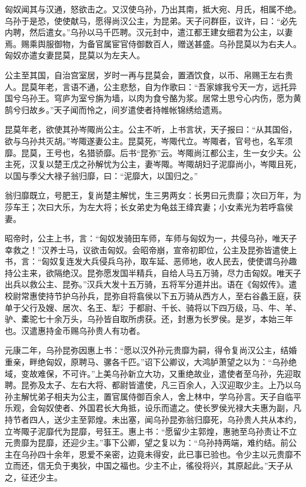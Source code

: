 \documentclass[]{article}
\begin{document}
匈奴闻其与汉通，怒欲击之。又汉使乌孙，乃出其南，抵大宛、月氏，相属不绝。乌孙于是恐，使使献马，愿得尚汉公主，为昆弟。天子问群臣，议许，曰：``必先内聘，然后遣女。''乌孙以马千匹聘。汉元封中，遣江都王建女细君为公主，以妻焉。赐乘舆服御物，为备官属宦官侍御数百人，赠送甚盛。乌孙昆莫以为右夫人。匈奴亦遣女妻昆莫，昆莫以为左夫人。

公主至其国，自治宫室居，岁时一再与昆莫会，置酒饮食，以币、帛赐王左右贵人。昆莫年老，言语不通，公主悲愁，自为作歌曰：``吾家嫁我兮天一方，远托异国兮乌孙王。穹庐为室兮旃为墙，以肉为食兮酪为浆。居常土思兮心内伤，愿为黄鹄兮归故乡。''天子闻而怜之，间岁遣使者持帷帐锦绣给遗焉。

昆莫年老，欲使其孙岑陬尚公主。公主不听，上书言状，天子报曰：``从其国俗，欲与乌孙共灭胡。''岑陬遂妻公主。昆莫死，岑陬代立。岑陬者，官号也，名军须靡。昆莫，王号也，名猎骄靡。后书``昆弥''云。岑陬尚江都公主，生一女少夫。公主死，汉复以楚王戊之孙解忧为公主，妻岑陬。岑陬胡妇子泥靡尚小，岑陬且死，以国与季父大禄子翁归靡，曰：``泥靡大，以国归之。''

翁归靡既立，号肥王，复尚楚主解忧，生三男两女：长男曰元贵靡；次曰万年，为莎车王；次曰大乐，为左大将；长女弟史为龟兹王绛宾妻；小女素光为若呼翕侯妻。

昭帝时，公主上书，言：``匈奴发骑田车师，车师与匈奴为一，共侵乌孙，唯天子幸救之！''汉养士马，议欲击匈奴。会昭帝崩，宣帝初即位，公主及昆弥皆遣使上书，言：``匈奴复连发大兵侵兵乌孙，取车延、恶师地，收人民去，使使谓乌孙趣持公主来，欲隔绝汉。昆弥愿发国半精兵，自给人马五万骑，尽力击匈奴。唯天子出兵以救公主、昆弥。''汉兵大发十五万骑，五将军分道并出。语在《匈奴传》。遣校尉常惠使持节护乌孙兵，昆弥自将翕侯以下五万骑从西方人，至右谷蠡王庭，获单于父行及嫂、居次、名王、犁氵于都尉、千长、骑将以下四万级，马、牛、羊、驴、橐驼七十余万头，乌孙皆自取所虏获。还，封惠为长罗侯。是岁，本始三年也。汉遣惠持金币赐乌孙贵人有功者。

元康二年，乌孙昆弥因惠上书：``愿以汉外孙元贵靡为嗣，得令复尚汉公主，结婚重亲，畔绝匈奴，原聘马、骡各千匹。''诏下公卿议，大鸿胪萧望之以为：``乌孙绝域，变故难保，不可许。''上美乌孙新立大功，又重绝故业，遣使者至乌孙，先迎取聘。昆弥及太子、左右大将、都尉皆遣使，凡三百余人，入汉迎取少主。上乃以乌孙主解忧弟子相夫为公主，置官属侍御百余人，舍上林中，学乌孙言。天子自临平乐观，会匈奴使者、外国君长大角抵，设乐而遣之。使长罗侯光禄大夫惠为副，凡持节者四人，送少主至郭煌。未出塞，闻乌孙昆弥翁归靡死，乌孙贵人共从本约，立岑陬子泥靡代为昆靡，号狂王。惠上书：``愿留少主郭煌，惠驰至乌孙责让不立元贵靡为昆靡，还迎少主。''事下公卿，望之复以为：``乌孙持两端，难约结。前公主在乌孙四十余年，恩爱不亲密，边竟未得安，此已事已验也。令少主以元贵靡不立而还，信无负于夷狄，中国之福也。少主不止，徭役将兴，其原起此。''天子从之，征还少主。
\end{document}
